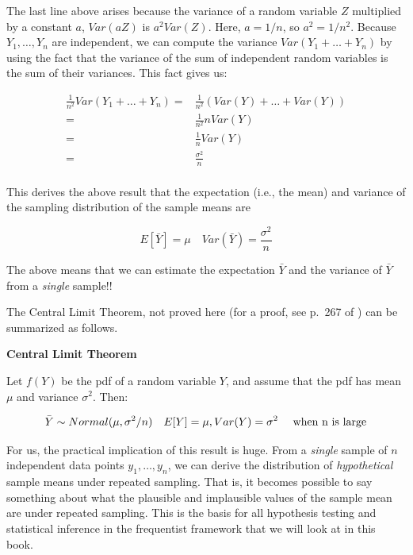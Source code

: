 \documentclass[12pt,]{krantz}
\begin{document}
The last line above arises because the variance of a random variable \(Z\) multiplied by a constant \(a\), \(Var(aZ)\) is \(a^2 Var(Z)\). Here, \(a=1/n\), so \(a^2 = 1/n^2\).
Because \(Y_1,\dots,Y_n\) are independent, we can compute the variance \(Var(Y_1 + \dots + Y_n)\) by using the fact that the variance of the sum of independent random variables is the sum of their variances. This fact gives us:

\begin{equation} \label{sdsmderivation}
\begin{split}
\frac{1}{n^2} Var(Y_1 + \dots + Y_n) =& \frac{1}{n^2} (Var(Y) + \dots + Var(Y))\\
=&  \frac{1}{n^2}  n Var(Y)\\
=&  \frac{1}{n}  Var(Y)\\
=&  \frac{\sigma^2}{n}\\
\end{split}
\end{equation}

This derives the above result that the expectation (i.e., the mean) and variance of the sampling distribution of the sample means are

\begin{equation}
E[\bar{Y}] = \mu \quad Var(\bar{Y}) = \frac{\sigma^2}{n}
\end{equation}

The above means that we can estimate the expectation \(\bar{Y}\) and the variance of \(\bar{Y}\) from a \emph{single} sample!!

The Central Limit Theorem, not proved here (for a proof, see p.~267 of \citet{millermiller}) can be summarized as follows.

\textbf{Central Limit Theorem}

Let \(f(Y)\) be the pdf of a random variable \(Y\), and assume that the pdf has mean \(\mu\) and variance \(\sigma^2\). Then:

\begin{equation}
\bar{Y} \sim Normal(\mu,\sigma^2/n) \quad  E[Y]=\mu,Var(Y)=\sigma^2 \quad \hbox{ when n is large}
\end{equation}

For us, the practical implication of this result is huge. From a \emph{single} sample of \(n\) independent data points \(y_1,\dots, y_n\), we can derive the distribution of \emph{hypothetical} sample means under repeated sampling. That is, it becomes possible to say something about what the plausible and implausible values of the sample mean are under repeated sampling. This is the basis for all hypothesis testing and statistical inference in the frequentist framework that we will look at in this book.
\end{document}
